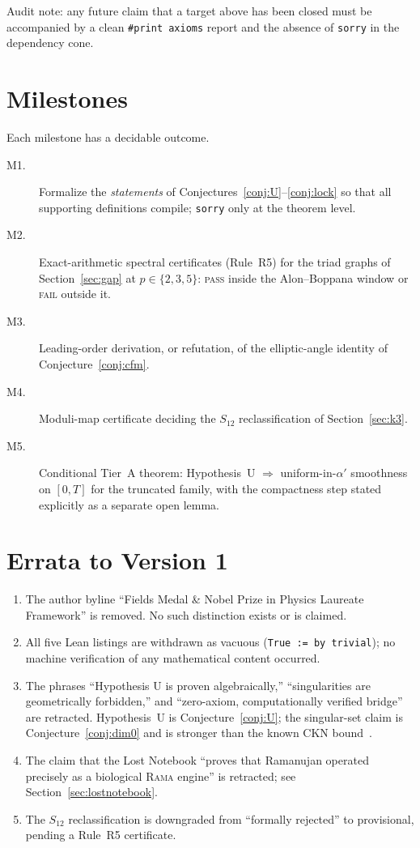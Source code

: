 \documentclass[11pt,a4paper]{article}
\theoremstyle{plain}
\theoremstyle{definition}
\theoremstyle{remark}
\begin{document}
\noindent Audit note: any future claim that a target above has been closed
must be accompanied by a clean \texttt{\#print axioms} report and the
absence of \texttt{sorry} in the dependency cone.

\section{Milestones}\label{sec:milestones}

Each milestone has a decidable outcome.

\begin{description}
\item[M1.] Formalize the \emph{statements} of
Conjectures~\ref{conj:U}--\ref{conj:lock} so that all supporting definitions
compile; \texttt{sorry} only at the theorem level.
\item[M2.] Exact-arithmetic spectral certificates (Rule~R5) for the triad
graphs of Section~\ref{sec:gap} at $p\in\{2,3,5\}$: \textsc{pass} inside the
Alon--Boppana window or \textsc{fail} outside it.
\item[M3.] Leading-order derivation, or refutation, of the elliptic-angle
identity of Conjecture~\ref{conj:cfm}.
\item[M4.] Moduli-map certificate deciding the $S_{12}$ reclassification of
Section~\ref{sec:k3}.
\item[M5.] Conditional Tier~A theorem: Hypothesis~U $\Rightarrow$
uniform-in-$\alpha'$ smoothness on $[0,T]$ for the truncated family, with
the compactness step stated explicitly as a separate open lemma.
\end{description}

\section{Errata to Version 1}\label{sec:errata}

\begin{enumerate}
\item The author byline ``Fields Medal \& Nobel Prize in Physics Laureate
Framework'' is removed. No such distinction exists or is claimed.
\item All five Lean listings are withdrawn as vacuous
(\texttt{True := by trivial}); no machine verification of any mathematical
content occurred.
\item The phrases ``Hypothesis U is proven algebraically,'' ``singularities
are geometrically forbidden,'' and ``zero-axiom, computationally verified
bridge'' are retracted. Hypothesis~U is Conjecture~\ref{conj:U}; the
singular-set claim is Conjecture~\ref{conj:dim0} and is stronger than the
known CKN bound~\cite{CKN1982}.
\item The claim that the Lost Notebook ``proves that Ramanujan operated
precisely as a biological \textsc{Rama} engine'' is retracted; see
Section~\ref{sec:lostnotebook}.
\item The $S_{12}$ reclassification is downgraded from ``formally rejected''
to provisional, pending a Rule~R5 certificate.
\end{enumerate}
\end{document}
